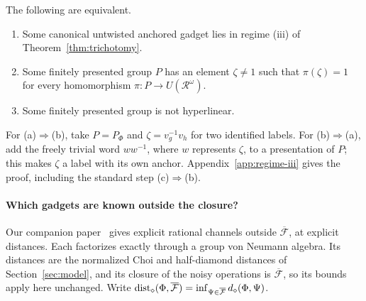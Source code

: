 \begin{proposition}\label{prop:regime-iii}
The following are equivalent.
\begin{enumerate}[label=(\alph*),itemsep=1pt]
\item Some canonical untwisted anchored gadget lies in regime (iii) of Theorem~\ref{thm:trichotomy}.
\item Some finitely presented group $P$ has an element $\zeta\ne1$ such that $\pi(\zeta)=1$ for every
homomorphism $\pi:P\to U(\mathcal R^\omega)$.
\item Some finitely presented group is not hyperlinear.
\end{enumerate}
\end{proposition}

For (a)$\Rightarrow$(b), take $P=P_\Phi$ and $\zeta=v_g^{-1}v_h$ for two identified labels. For
(b)$\Rightarrow$(a), add the freely trivial word $ww^{-1}$, where $w$ represents $\zeta$, to a
presentation of $P$; this makes $\zeta$ a label with its own anchor. Appendix~\ref{app:regime-iii}
gives the proof, including the standard step (c)$\Rightarrow$(b).

\paragraph{Which gadgets are known outside the closure?}
Our companion paper~\cite{MghirbiDouglasD} gives explicit rational channels outside
$\overline{\mathcal F}$, at explicit distances. Each factorizes exactly through a group von Neumann
algebra. Its distances are the normalized Choi and half-diamond distances of Section~\ref{sec:model},
and its closure of the noisy operations is $\overline{\mathcal F}$, so its bounds apply here unchanged.
Write $\operatorname{dist}_\diamond(\Phi,\overline{\mathcal F})=\inf_{\Psi\in\overline{\mathcal F}}d_\diamond(\Phi,\Psi)$.

